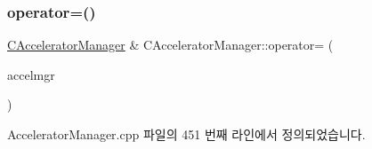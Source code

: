 \subsubsection{\texorpdfstring{operator=()}{operator=()}}
{\footnotesize\ttfamily \mbox{\hyperlink{class_c_accelerator_manager}{C\+Accelerator\+Manager}} \& C\+Accelerator\+Manager\+::operator= (\begin{DoxyParamCaption}\item[{\mbox{\hyperlink{getopt1_8c_a2c212835823e3c54a8ab6d95c652660e}{const}} \mbox{\hyperlink{class_c_accelerator_manager}{C\+Accelerator\+Manager}} \&}]{accelmgr }\end{DoxyParamCaption})}



Accelerator\+Manager.\+cpp 파일의 451 번째 라인에서 정의되었습니다.


